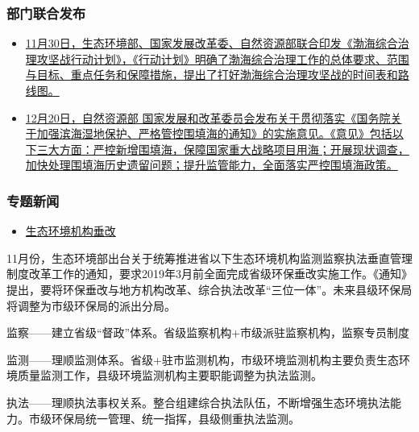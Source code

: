\documentclass[
]{book}
\providecommand{\tightlist}{%
  \setlength{\itemsep}{0pt}\setlength{\parskip}{0pt}}
\begin{document}
\hypertarget{ux90e8ux95e8ux8054ux5408ux53d1ux5e03-1}{%
\subsubsection*{部门联合发布}\label{ux90e8ux95e8ux8054ux5408ux53d1ux5e03-1}}

\begin{itemize}
\item
  \href{http://www.gov.cn/xinwen/2018-11/29/content_5344537.htm}{11月30日，生态环境部、国家发展改革委、自然资源部联合印发《渤海综合治理攻坚战行动计划》，《行动计划》明确了渤海综合治理工作的总体要求、范围与目标、重点任务和保障措施，提出了打好渤海综合治理攻坚战的时间表和路线图。}
\item
  \href{http://www.ndrc.gov.cn/zcfb/zcfbghwb/201811/t20181107_919133.html}{12月20日，自然资源部 国家发展和改革委员会发布关于贯彻落实《国务院关于加强滨海湿地保护、严格管控围填海的通知》的实施意见。《意见》包括以下三大方面：严控新增围填海，保障国家重大战略项目用海；开展现状调查，加快处理围填海历史遗留问题；提升监管能力，全面落实严控围填海政策。}
\end{itemize}

\hypertarget{ux4e13ux9898ux65b0ux95fb}{%
\subsubsection*{专题新闻}\label{ux4e13ux9898ux65b0ux95fb}}

\begin{itemize}
\tightlist
\item
  \href{http://www.jxepb.gov.cn/ZWGK/ZTZL/hjtzggqhzrddzl/zcwj/2018/0d1de54e2b4043338527246d1f9e3252.htm}{生态环境机构垂改}
\end{itemize}

11月份，生态环境部出台关于统筹推进省以下生态环境机构监测监察执法垂直管理制度改革工作的通知，要求2019年3月前全面完成省级环保垂改实施工作。《通知》提出，要将环保垂改与地方机构改革、综合执法改革``三位一体''。未来县级环保局将调整为市级环保局的派出分局。

监察------建立省级``督政''体系。省级监察机构+市级派驻监察机构，监察专员制度

监测------理顺监测体系。省级+驻市监测机构，市级环境监测机构主要负责生态环境质量监测工作，县级环境监测机构主要职能调整为执法监测。

执法------理顺执法事权关系。整合组建综合执法队伍，不断增强生态环境执法能力。市级环保局统一管理、统一指挥，县级侧重执法监测。
\end{document}

